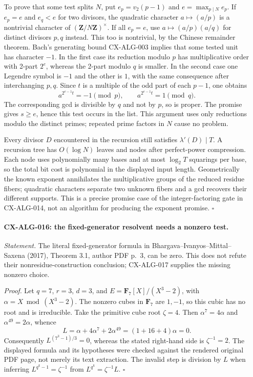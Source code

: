 To prove that some test splits $N$, put
$e_p=v_2(p-1)$ and $e=\max_{p\mid N}e_p$. If $e_p=e$ and $e_q<e$ for
two divisors, the quadratic character $a\mapsto(a/p)$ is a nontrivial
character of $(\mathbf Z/N\mathbf Z)^\times$. If all $e_p=e$, use
$a\mapsto(a/p)(a/q)$ for distinct divisors $p,q$ instead. This too is
nontrivial, by the Chinese remainder theorem. Bach's generating bound
CX-ALG-003 implies that some tested unit has character $-1$.
In the first case its reduction modulo $p$ has multiplicative order with
2-part $2^e$, whereas the 2-part modulo $q$ is smaller. In the second
case one Legendre symbol is $-1$ and the other is $1$, with the same
consequence after interchanging $p,q$. Since $t$ is a multiple of the odd
part of each $p-1$, one obtains
\[
       a^{2^{e-1}t}=-1\pmod p,\qquad
       a^{2^{e-1}t}=1\pmod q.
\]
The corresponding gcd is divisible by $q$ and not by $p$, so is proper.
The promise gives $s\ge e$, hence this test occurs in the list. This
argument uses only reductions modulo the distinct primes; repeated prime
factors in $N$ cause no problem.

Every divisor $D$ encountered in the recursion still satisfies
$\lambda'(D)\mid T$. A recursion tree has $O(\log N)$ leaves and nodes
after perfect-power compression. Each node uses polynomially many bases
and at most $\log_2T$ squarings per base, so the total bit cost is
polynomial in the displayed input length. Geometrically the known exponent
annihilates the multiplicative groups of the reduced residue fibers;
quadratic characters separate two unknown fibers and a gcd recovers their
different supports. This is a precise promise case of the integer-factoring
gate in CX-ALG-014, not an algorithm for producing the exponent promise.
\hfill$\square$

\paragraph{CX-ALG-016: the fixed-generator resolvent needs a nonzero test.}
\emph{Statement.} The literal fixed-generator formula in
Bhargava--Ivanyos--Mittal--Saxena (2017), Theorem 3.1, author PDF p.~3,
can be zero. This does not refute their nonresidue-construction conclusion;
CX-ALG-017 supplies the missing nonzero choice.

\emph{Proof.} Let $q=7$, $r=3$, $d=3$, and
$E=\mathbf F_7[X]/(X^3-2)$, with $\alpha=X\bmod(X^3-2)$.
The nonzero cubes in $\mathbf F_7$ are $1,-1$, so this cubic has no root
and is irreducible. Take the primitive cube root $\zeta=4$. Then
$\alpha^7=4\alpha$ and $\alpha^{49}=2\alpha$, whence
\[
 L=\alpha+4\alpha^7+2\alpha^{49}
   =(1+16+4)\alpha=0.
\]
Consequently $L^{(7^3-1)/3}=0$, whereas the stated right-hand side is
$\zeta^{-1}=2$. The displayed formula and its hypotheses were checked
against the rendered original PDF page, not merely its text extraction.
The invalid step is division by $L$ when inferring
$L^{q^k-1}=\zeta^{-1}$ from $L^{q^k}=\zeta^{-1}L$.
\hfill$\square$

